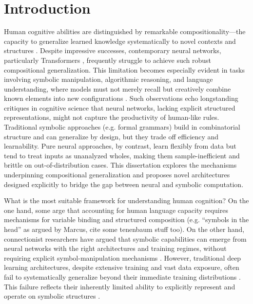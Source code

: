 \chapter{Introduction} \label{chap:chap-0}

Human cognitive abilities are distinguished by remarkable compositionality—the capacity to generalize learned knowledge systematically to novel contexts and structures \citep{fodor1988connectionism,lake2018generalization}. Despite impressive successes, contemporary neural networks, particularly Transformers \citep{vaswani2017attention}, frequently struggle to achieve such robust compositional generalization. This limitation becomes especially evident in tasks involving symbolic manipulation, algorithmic reasoning, and language understanding, where models must not merely recall but creatively combine known elements into new configurations \citep{marcus2003algebraic, lake2018generalization}. Such observations echo longstanding critiques in cognitive science that neural networks, lacking explicit structured representations, might not capture the productivity of human-like rules. Traditional symbolic approaches (e.g. formal grammars) build in combinatorial structure and can generalize by design, but they trade off efficiency and learnability. Pure neural approaches, by contrast, learn flexibly from data but tend to treat inputs as unanalyzed wholes, making them sample-inefficient and brittle on out-of-distribution cases. This dissertation explores the mechanisms underpinning compositional generalization and proposes novel architectures designed explicitly to bridge the gap between neural and symbolic computation.

What is the most suitable framework for understanding human cognition? On the one hand, some arge that accounting for human language capacity requires mechanisms for variable binding and structured composition (e.g. “symbols in the head” as argued by Marcus, cite some tenenbaum stuff too). On the other hand, connectionist researchers have argued that symbolic capabilities can emerge from neural networks with the right architectures and training regimes, without requiring explicit symbol-manipulation mechanisms \citep{elman_finding_1990, rumelhart1986c}. However, traditional deep learning architectures, despite extensive training and vast data exposure, often fail to systematically generalize beyond their immediate training distributions \citep{kim-linzen-2020-cogs, hupkes2020compositionality}. This failure reflects their inherently limited ability to explicitly represent and operate on symbolic structures \citep{Smolensky1990TensorPV}.

